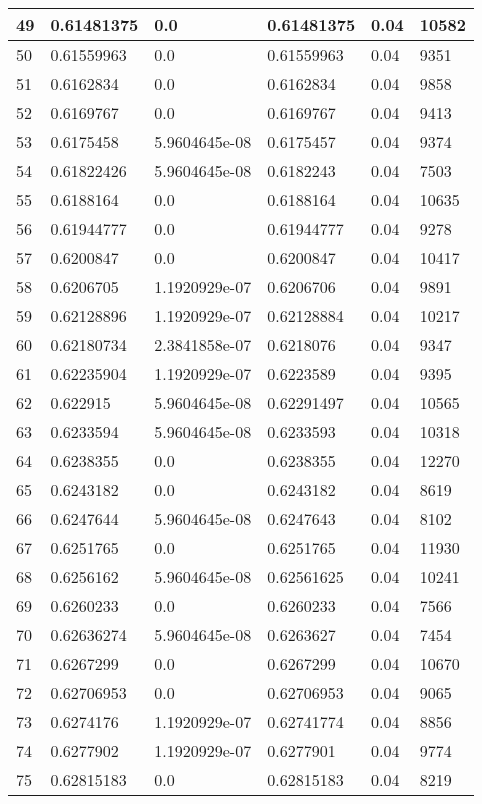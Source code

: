\begin{longtable}{|l|l|l|l|l|l|}
49 & 0.61481375 & 0.0 & 0.61481375 & 0.04 & 10582 \\ \hline 
50 & 0.61559963 & 0.0 & 0.61559963 & 0.04 & 9351 \\ \hline 
51 & 0.6162834 & 0.0 & 0.6162834 & 0.04 & 9858 \\ \hline 
52 & 0.6169767 & 0.0 & 0.6169767 & 0.04 & 9413 \\ \hline 
53 & 0.6175458 & 5.9604645e-08 & 0.6175457 & 0.04 & 9374 \\ \hline 
54 & 0.61822426 & 5.9604645e-08 & 0.6182243 & 0.04 & 7503 \\ \hline 
55 & 0.6188164 & 0.0 & 0.6188164 & 0.04 & 10635 \\ \hline 
56 & 0.61944777 & 0.0 & 0.61944777 & 0.04 & 9278 \\ \hline 
57 & 0.6200847 & 0.0 & 0.6200847 & 0.04 & 10417 \\ \hline 
58 & 0.6206705 & 1.1920929e-07 & 0.6206706 & 0.04 & 9891 \\ \hline 
59 & 0.62128896 & 1.1920929e-07 & 0.62128884 & 0.04 & 10217 \\ \hline 
60 & 0.62180734 & 2.3841858e-07 & 0.6218076 & 0.04 & 9347 \\ \hline 
61 & 0.62235904 & 1.1920929e-07 & 0.6223589 & 0.04 & 9395 \\ \hline 
62 & 0.622915 & 5.9604645e-08 & 0.62291497 & 0.04 & 10565 \\ \hline 
63 & 0.6233594 & 5.9604645e-08 & 0.6233593 & 0.04 & 10318 \\ \hline 
64 & 0.6238355 & 0.0 & 0.6238355 & 0.04 & 12270 \\ \hline 
65 & 0.6243182 & 0.0 & 0.6243182 & 0.04 & 8619 \\ \hline 
66 & 0.6247644 & 5.9604645e-08 & 0.6247643 & 0.04 & 8102 \\ \hline 
67 & 0.6251765 & 0.0 & 0.6251765 & 0.04 & 11930 \\ \hline 
68 & 0.6256162 & 5.9604645e-08 & 0.62561625 & 0.04 & 10241 \\ \hline 
69 & 0.6260233 & 0.0 & 0.6260233 & 0.04 & 7566 \\ \hline 
70 & 0.62636274 & 5.9604645e-08 & 0.6263627 & 0.04 & 7454 \\ \hline 
71 & 0.6267299 & 0.0 & 0.6267299 & 0.04 & 10670 \\ \hline 
72 & 0.62706953 & 0.0 & 0.62706953 & 0.04 & 9065 \\ \hline 
73 & 0.6274176 & 1.1920929e-07 & 0.62741774 & 0.04 & 8856 \\ \hline 
74 & 0.6277902 & 1.1920929e-07 & 0.6277901 & 0.04 & 9774 \\ \hline 
75 & 0.62815183 & 0.0 & 0.62815183 & 0.04 & 8219 \\ \hline 
\end{longtable}